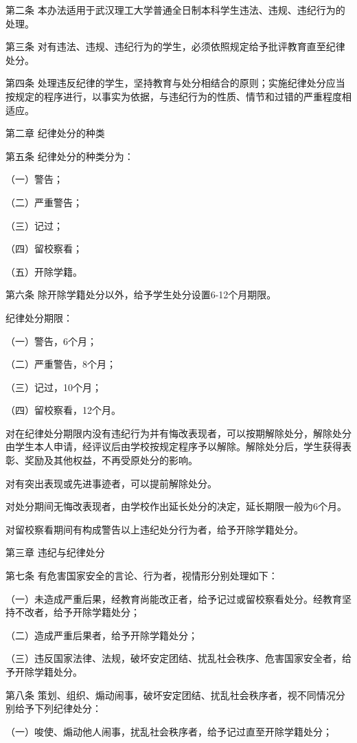 \documentclass[UTF8,12pt,a4paper]{report}
\begin{document}
第二条  本办法适用于武汉理工大学普通全日制本科学生违法、违规、违纪行为的处理。

第三条  对有违法、违规、违纪行为的学生，必须依照规定给予批评教育直至纪律处分。

第四条  处理违反纪律的学生，坚持教育与处分相结合的原则；实施纪律处分应当按规定的程序进行，以事实为依据，与违纪行为的性质、情节和过错的严重程度相适应。



第二章  纪律处分的种类

第五条  纪律处分的种类分为：

（一）警告；

（二）严重警告；

（三）记过；

（四）留校察看；

（五）开除学籍。

第六条  除开除学籍处分以外，给予学生处分设置6-12个月期限。

纪律处分期限：

（一）警告，6个月；

（二）严重警告，8个月；

（三）记过，10个月；

（四）留校察看，12个月。

对在纪律处分期限内没有违纪行为并有悔改表现者，可以按期解除处分，解除处分由学生本人申请，经评议后由学校按规定程序予以解除。解除处分后，学生获得表彰、奖励及其他权益，不再受原处分的影响。

对有突出表现或先进事迹者，可以提前解除处分。

对处分期间无悔改表现者，由学校作出延长处分的决定，延长期限一般为6个月。

对留校察看期间有构成警告以上违纪处分行为者，给予开除学籍处分。



第三章  违纪与纪律处分

第七条  有危害国家安全的言论、行为者，视情形分别处理如下：

（一）未造成严重后果，经教育尚能改正者，给予记过或留校察看处分。经教育坚持不改者，给予开除学籍处分；

（二）造成严重后果者，给予开除学籍处分；

（三）违反国家法律、法规，破坏安定团结、扰乱社会秩序、危害国家安全者，给予开除学籍处分。

第八条  策划、组织、煽动闹事，破坏安定团结、扰乱社会秩序者，视不同情况分别给予下列纪律处分：

（一）唆使、煽动他人闹事，扰乱社会秩序者，给予记过直至开除学籍处分；
\end{document}
